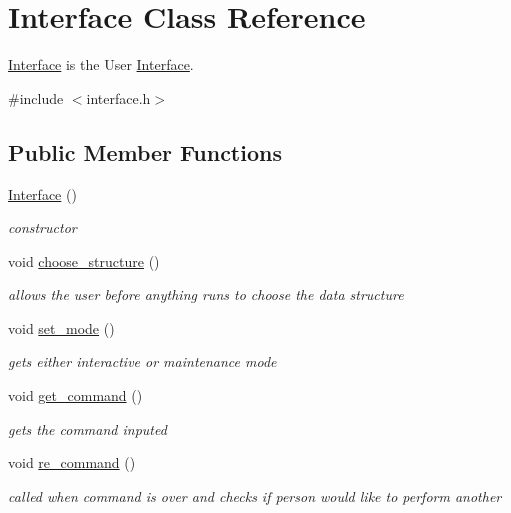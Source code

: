 \hypertarget{class_interface}{}\section{Interface Class Reference}
\label{class_interface}


\hyperlink{class_interface}{Interface} is the User \hyperlink{class_interface}{Interface}.  




{\ttfamily \#include $<$interface.\+h$>$}

\subsection*{Public Member Functions}
\begin{DoxyCompactItemize}
\item 
\hyperlink{class_interface_a4406d74c75bdfe150bf72be1f1cda8b1}{Interface} ()
\begin{DoxyCompactList}\small\item\em constructor \end{DoxyCompactList}\item 
void \hyperlink{class_interface_a182ad83393eb72b7db55f0e65d4a0ad6}{choose\+\_\+structure} ()
\begin{DoxyCompactList}\small\item\em allows the user before anything runs to choose the data structure \end{DoxyCompactList}\item 
void \hyperlink{class_interface_a2c7d25d68192d1dd451be039922b2b46}{set\+\_\+mode} ()
\begin{DoxyCompactList}\small\item\em gets either interactive or maintenance mode \end{DoxyCompactList}\item 
void \hyperlink{class_interface_ac7d71f89f09c5367e9d998291526acfc}{get\+\_\+command} ()
\begin{DoxyCompactList}\small\item\em gets the command inputed \end{DoxyCompactList}\item 
void \hyperlink{class_interface_ae2e80336e351baf5c266bd85bb4f9281}{re\+\_\+command} ()
\begin{DoxyCompactList}\small\item\em called when command is over and checks if person would like to perform another \end{DoxyCompactList}\item 

\end{DoxyCompactItemize}
